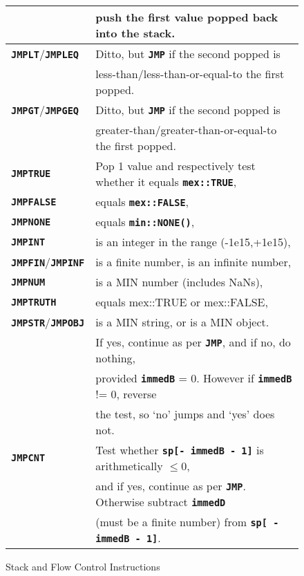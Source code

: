 \documentclass[12pt]{article}
\makeatletter
\newcommand{\TT}[1]{{\tt \bfseries #1}}
\newcommand{\ttkey}[1]{\TT{#1}\index{#1@{\tt #1}}}
\newlength{\figurewidth}
\newenvironment{boxedfigure}[1][!btp]%
	{\begin{figure*}[#1]
	 \begin{lrbox}{\figurebox}
	 \begin{minipage}{\figurewidth}

	 \vspace*{1ex}}%
	{
	 \vspace*{1ex}

	 \end{minipage}
	 \end{lrbox}

	 \centering
	 \fbox{\hspace*{0.1in}\usebox{\figurebox}\hspace*{0.1in}}
	 \end{figure*}}
\makeatother
\begin{document}
\begin{boxedfigure}
\begin{center}
\begin{tabular}{|l|l|}
    & push the first value popped back into the stack.
\\\hline
\ttkey{JMPLT}/\ttkey{JMPLEQ}
    & Ditto, but \TT{JMP} if the second popped is \\
    & less-than/less-than-or-equal-to the first popped.
\\\hline
\ttkey{JMPGT}/\ttkey{JMPGEQ}
    & Ditto, but \TT{JMP} if the second popped is \\
    & greater-than/greater-than-or-equal-to the first popped.
\\\hline
\ttkey{JMPTRUE}
    & Pop 1 value and respectively test whether it equals \TT{mex::TRUE}, \\
\ttkey{JMPFALSE}
    & equals \TT{mex::FALSE}, \\
\ttkey{JMPNONE}
    & equals \TT{min::NONE()}, \\
\ttkey{JMPINT}
    & is an integer in the range (-1e15,+1e15), \\
\ttkey{JMPFIN}/\ttkey{JMPINF}
    & is a finite number, is an infinite number, \\
\ttkey{JMPNUM}
    & is a MIN number (includes NaNs), \\
\ttkey{JMPTRUTH}
    & equals mex::TRUE or mex::FALSE, \\
\ttkey{JMPSTR}/\ttkey{JMPOBJ}
    & is a MIN string, or is a MIN object. \\
    & If yes, continue as per \TT{JMP}, and if no, do nothing, \\
    & provided \TT{immedB} = 0.  However if \TT{immedB} != 0, reverse \\
    & the test, so `no' jumps and `yes' does not.
\\\hline
\ttkey{JMPCNT}
    & Test whether \TT{sp[- immedB - 1]} is arithmetically $\leq 0$, \\
    & and if yes, continue as per \TT{JMP}.  Otherwise subtract \TT{immedD} \\
    & (must be a finite number) from \TT{sp[ - immedB - 1]}.
\\\hline
\end{tabular}
\end{center}
\vspace*{-3ex}
\caption{Stack and Flow Control Instructions}
\label{STACK-AND-FLOW-CONTROL-INSTRUCTIONS}
\end{boxedfigure}

\pagebreak
\end{document}
